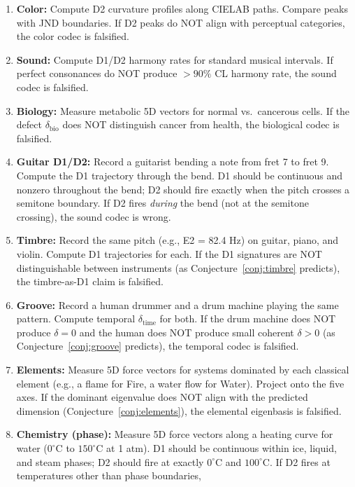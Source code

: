 \documentclass[11pt]{article}
\theoremstyle{definition}
\theoremstyle{remark}
\begin{document}
\begin{enumerate}[nosep]
  \item \textbf{Color:} Compute D2 curvature profiles along CIELAB paths.  Compare
    peaks with JND boundaries.  If D2 peaks do NOT align with perceptual categories,
    the color codec is falsified.
  \item \textbf{Sound:} Compute D1/D2 harmony rates for standard musical intervals.
    If perfect consonances do NOT produce $> 90\%$ CL harmony rate, the sound codec
    is falsified.
  \item \textbf{Biology:} Measure metabolic 5D vectors for normal vs.\ cancerous cells.
    If the defect $\delta_{\mathrm{bio}}$ does NOT distinguish cancer from health,
    the biological codec is falsified.
  \item \textbf{Guitar D1/D2:} Record a guitarist bending a note from fret 7 to
    fret 9.  Compute the D1 trajectory through the bend.  D1 should be continuous
    and nonzero throughout the bend; D2 should fire exactly when the pitch crosses
    a semitone boundary.  If D2 fires \emph{during} the bend (not at the semitone
    crossing), the sound codec is wrong.
  \item \textbf{Timbre:} Record the same pitch (e.g., E2 = 82.4 Hz) on guitar,
    piano, and violin.  Compute D1 trajectories for each.  If the D1 signatures are
    NOT distinguishable between instruments (as Conjecture~\ref{conj:timbre} predicts),
    the timbre-as-D1 claim is falsified.
  \item \textbf{Groove:} Record a human drummer and a drum machine playing the same
    pattern.  Compute temporal $\delta_{\text{time}}$ for both.  If the drum machine
    does NOT produce $\delta = 0$ and the human does NOT produce small coherent
    $\delta > 0$ (as Conjecture~\ref{conj:groove} predicts), the temporal codec is
    falsified.
  \item \textbf{Elements:} Measure 5D force vectors for systems dominated by each
    classical element (e.g., a flame for Fire, a water flow for Water).  Project onto
    the five axes.  If the dominant eigenvalue does NOT align with the predicted
    dimension (Conjecture~\ref{conj:elements}), the elemental eigenbasis is falsified.
  \item \textbf{Chemistry (phase):} Measure 5D force vectors along a heating curve
    for water ($0^{\circ}$C to $150^{\circ}$C at 1 atm).  D1 should be continuous
    within ice, liquid, and steam phases; D2 should fire at exactly $0^{\circ}$C
    and $100^{\circ}$C.  If D2 fires at temperatures other than phase boundaries,

\end{enumerate}
\end{document}
